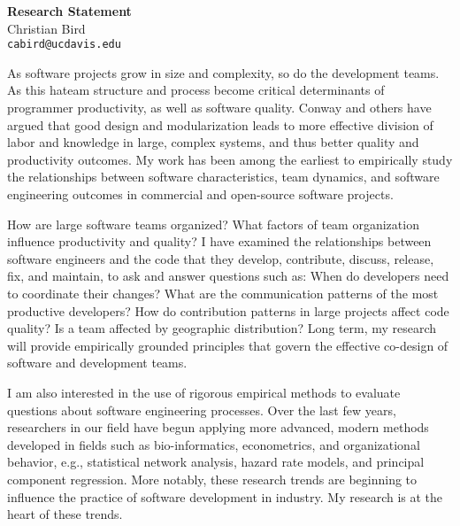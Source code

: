 \documentclass[9pt]{article}
\begin{document}
\thispagestyle{empty}
\lhead{}
\rhead{}
\renewcommand{\headrulewidth}{0pt} 
\renewcommand{\footrulewidth}{0pt} 

\begin{small}

\begin{center}
{\LARGE \bf Research Statement}\\
\vspace*{0.2cm}
{\large Christian Bird}\\
\vspace*{0cm}
\texttt{\normalsize cabird@ucdavis.edu}
\end{center}

As software
projects grow in size and complexity, so do the development teams.  As this
hateam structure and process  become critical determinants of programmer
productivity, as well as software quality.  Conway and others have argued that
good design and modularization leads to more effective division of labor and
knowledge in large, complex systems, and thus better quality and productivity
outcomes.  My work has been among the earliest to empirically study the
relationships between software characteristics, team dynamics, and software
engineering outcomes in commercial and open-source software projects.  

How are large software teams organized? What factors of team organization
influence productivity and quality?  I have examined the relationships between
software engineers and the code that they develop, contribute, discuss,
release, fix, and maintain, to ask and answer questions such as: When do
developers need to coordinate their changes?  What are the communication
patterns of the most productive developers?  How do contribution patterns in
large projects affect code quality? Is a team affected by geographic
distribution?  Long term, my research will provide empirically grounded
principles that govern the effective co-design of software and development
teams. 

I am also interested in the use of rigorous empirical methods to evaluate
questions about software engineering processes.  Over the last few years,
researchers in our field have begun applying more advanced, modern methods
developed in fields such as bio-informatics, econometrics, and organizational
behavior, e.g., statistical network analysis, hazard rate models, and principal
component regression.  More notably, these research trends are beginning to
influence the practice of software development in industry.  My research is at
the heart of these trends.



\end{small}
\end{document}
